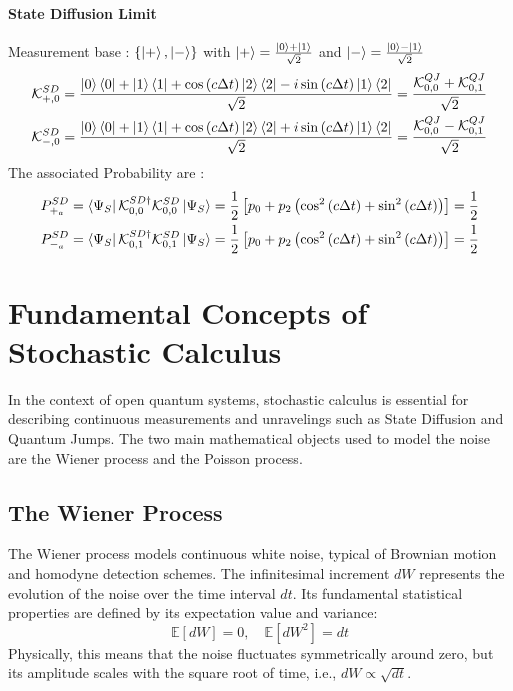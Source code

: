 \documentclass[a4paper,12pt]{article}
\begin{document}
	\paragraph{State Diffusion Limit}
	Measurement base : $ \{ \ket{+}, \ket{-} \} $ with $ \ket{+} = \frac{\ket{0} + \ket{1}}{\sqrt{2}} $ and $ \ket{-} = \frac{\ket{0} - \ket{1}}{\sqrt{2}} $
	\begin{gather}
		\mathcal{K}_{+, 0}^{SD} = \frac{\ket{0}\bra{0} + \ket{1}\bra{1} + \cos \left( c \Delta t \right) \ket{2}\bra{2} -i \sin \left( c \Delta t \right) \ket{1}\bra{2}}{\sqrt{2}} = \frac{\mathcal{K}_{0,0}^{QJ} + \mathcal{K}_{0,1}^{QJ}}{\sqrt{2}}\\ 
		\mathcal{K}_{-, 0}^{SD} = \frac{\ket{0}\bra{0} + \ket{1}\bra{1} + \cos \left( c \Delta t \right) \ket{2}\bra{2} +i \sin \left( c \Delta t \right) \ket{1}\bra{2} }{\sqrt{2}}= \frac{\mathcal{K}_{0,0}^{QJ} - \mathcal{K}_{0,1}^{QJ}}{\sqrt{2}}
	\end{gather}
	The associated Probability are :
	\begin{gather}
		P_{+_{a}}^{SD} = \bra{\Psi_{S}}\mathcal{K}_{0,0}^{SD \dagger} \mathcal{K}_{0,0}^{SD}\ket{\Psi_{S}} = \frac{1}{2} \left[ p_{0} + p_{2} \left(\cos^{2} \left( c \Delta t \right) + \sin^{2} \left( c \Delta t \right) \right) \right] = \frac{1}{2} \\
		P_{-_{a}}^{SD} = \bra{\Psi_{S}}\mathcal{K}_{0,1}^{SD \dagger} \mathcal{K}_{0,1}^{SD}\ket{\Psi_{S}} = \frac{1}{2} \left[ p_{0} + p_{2} \left(\cos^{2} \left( c \Delta t \right) + \sin^{2} \left( c \Delta t \right) \right) \right] = \frac{1}{2}
	\end{gather}
	
	\newpage
	
	\section{Fundamental Concepts of Stochastic Calculus}
	
	In the context of open quantum systems, stochastic calculus is essential for describing continuous measurements and unravelings such as State Diffusion and Quantum Jumps. The two main mathematical objects used to model the noise are the Wiener process and the Poisson process.
	
	\subsection{The Wiener Process}
	
	The Wiener process models continuous white noise, typical of Brownian motion and homodyne detection schemes. The infinitesimal increment $dW$ represents the evolution of the noise over the time interval $dt$. Its fundamental statistical properties are defined by its expectation value and variance:
	\begin{equation}
		\mathbb{E}[dW] = 0, \quad \mathbb{E}[dW^2] = dt
	\end{equation}
	Physically, this means that the noise fluctuates symmetrically around zero, but its amplitude scales with the square root of time, i.e., $dW \propto \sqrt{dt}$.
	
\end{document}
